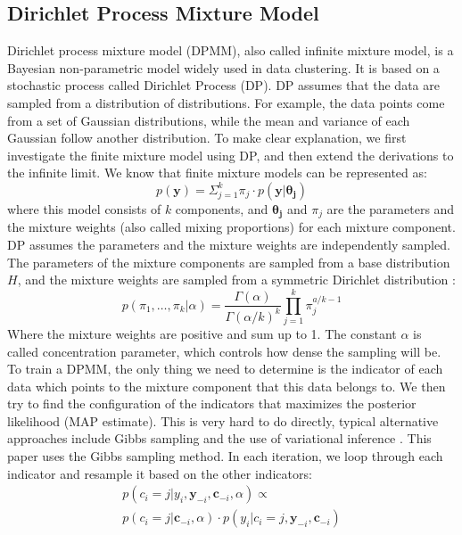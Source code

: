 \documentclass[journal]{IEEEtran}
\begin{document}
\subsection{Dirichlet Process Mixture Model}
Dirichlet process mixture model (DPMM), also called infinite mixture model, is a Bayesian non-parametric model widely used in data clustering. 
It is based on a stochastic process called Dirichlet Process (DP).
DP assumes that the data are sampled from a distribution of distributions. For example, the data points come from a set of Gaussian distributions, while the mean and variance of each Gaussian follow another distribution. 
To make clear explanation, we first investigate the finite mixture model using DP, and then extend the derivations to the infinite limit.
We know that finite mixture models can be represented as:
\begin{equation}
p(\bm{y}) = \Sigma_{j=1}^k \pi_j \cdot p(\bm{y}|\bm{\theta_j})
\label{finite_mixture_model}
\end{equation}
where this model consists of $k$ components, and $\bm{\theta_j}$ and $\pi_j$ are the parameters and the mixture weights (also called mixing proportions) for each mixture component.
DP assumes the parameters and the mixture weights are independently sampled. 
The parameters of the mixture components are sampled from a base distribution $H$, and the mixture weights are sampled from a symmetric Dirichlet distribution \cite{DP}:
 \begin{equation}
p(\pi_1, \dots, \pi_k | \alpha) = 
\frac{\Gamma(\alpha)}{\Gamma(\alpha / k)^k} \prod_{j=1}^k \pi_j^{a/k - 1}
\label{Dirichlet_distribution}
\end{equation}
Where the mixture weights are positive and sum up to 1. The constant $\alpha$ is called concentration parameter, which controls how dense the sampling will be.
To train a DPMM, the only thing we need to determine is the indicator of each data which points to the mixture component that this data belongs to. 
We then try to find the configuration of the indicators that maximizes the posterior likelihood (MAP estimate). 
This is very hard to do directly, typical alternative approaches include Gibbs sampling \cite{Gibbs_sampling, Gibbs} and the use of variational inference \cite{variational_method}.
This paper uses the Gibbs sampling method. 
In each iteration, we loop through each indicator and resample it based on the other indicators:
\begin{equation}
\begin{gathered}
p(c_i = j|y_i, \bm{y}_{-i}, \bm{c}_{-i}, \alpha) 
\propto  \\
p(c_i = j|\bm{c}_{-i}, \alpha) \cdot
p(y_i|c_i=j, \bm{y}_{-i}, \bm{c}_{-i})
\end{gathered}
\label{indicator_posterior}
\end{equation}
\end{document}
